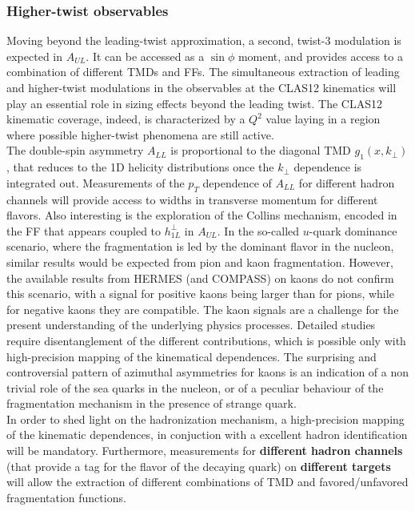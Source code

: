 \subsubsection{Higher-twist observables}
Moving beyond the leading-twist approximation, a second, twist-3 modulation is expected in $A_{UL}$. It can be accessed as a $\sin\phi$ moment, and provides access to a combination of different TMDs and FFs. The simultaneous extraction of leading and higher-twist modulations in the observables at the CLAS12 kinematics will play an essential role in sizing effects beyond the leading twist. The CLAS12 kinematic coverage, indeed, is characterized by a $Q^2$ value laying in a region where possible higher-twist phenomena are still active.\\ %
%
The double-spin asymmetry $A_{LL}$ is proportional to the diagonal TMD $g_1(x, k_\perp)$, that reduces to the 1D helicity distributions once the $k_\perp$ dependence is integrated out. Measurements of the $p_T$ dependence of $A_{LL}$ for different hadron channels will provide access to widths in transverse momentum for different flavors. 
%
%
Also interesting is the exploration of the Collins mechanism, encoded in the FF that appears coupled to $h_{1 L}^{\perp}$ in $A_{UL}$. In the so-called $u$-quark dominance scenario, where the fragmentation is led by the dominant flavor in the nucleon, similar results would be expected from pion and kaon fragmentation. However, the available results from HERMES (and COMPASS) on kaons do not confirm this scenario, with a signal for positive kaons being larger than for pions, while for negative kaons they are compatible. The kaon signals are a challenge for the present understanding of the underlying physics processes. Detailed studies require disentanglement of the different contributions, which is possible only
with high-precision mapping of the kinematical dependences. The surprising and controversial pattern of azimuthal asymmetries for kaons is an indication of a non trivial role of the sea quarks in the nucleon, or of a peculiar behaviour of the fragmentation mechanism in the presence of strange quark.\\

In order to shed light on the hadronization mechanism, a high-precision mapping of the kinematic dependences, in conjuction with a excellent hadron identification will be mandatory. Furthermore, measurements for {\bf different hadron channels} (that provide a tag for the flavor of the decaying quark) on {\bf different targets} will allow the extraction of different combinations of TMD and favored/unfavored fragmentation functions. 
%
%
%
